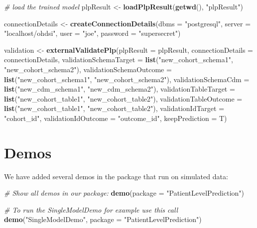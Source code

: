 \documentclass[]{article}
\newenvironment{Shaded}{\begin{snugshade}}{\end{snugshade}}
\newcommand{\KeywordTok}[1]{\textcolor[rgb]{0.13,0.29,0.53}{\textbf{#1}}}
\newcommand{\DataTypeTok}[1]{\textcolor[rgb]{0.13,0.29,0.53}{#1}}
\newcommand{\StringTok}[1]{\textcolor[rgb]{0.31,0.60,0.02}{#1}}
\newcommand{\CommentTok}[1]{\textcolor[rgb]{0.56,0.35,0.01}{\textit{#1}}}
\newcommand{\NormalTok}[1]{#1}
\begin{document}
\begin{Shaded}
\begin{Highlighting}[]
\CommentTok{# load the trained model}
\NormalTok{plpResult <-}\StringTok{ }\KeywordTok{loadPlpResult}\NormalTok{(}\KeywordTok{getwd}\NormalTok{(), }\StringTok{"plpResult"}\NormalTok{)}

\NormalTok{connectionDetails <-}\StringTok{ }\KeywordTok{createConnectionDetails}\NormalTok{(}\DataTypeTok{dbms =} \StringTok{"postgresql"}\NormalTok{, }\DataTypeTok{server =} \StringTok{"localhost/ohdsi"}\NormalTok{, }
    \DataTypeTok{user =} \StringTok{"joe"}\NormalTok{, }\DataTypeTok{password =} \StringTok{"supersecret"}\NormalTok{)}

\NormalTok{validation <-}\StringTok{ }\KeywordTok{externalValidatePlp}\NormalTok{(}\DataTypeTok{plpResult =}\NormalTok{ plpResult, }\DataTypeTok{connectionDetails =}\NormalTok{ connectionDetails, }
    \DataTypeTok{validationSchemaTarget =} \KeywordTok{list}\NormalTok{(}\StringTok{"new_cohort_schema1"}\NormalTok{, }\StringTok{"new_cohort_schema2"}\NormalTok{), }
    \DataTypeTok{validationSchemaOutcome =} \KeywordTok{list}\NormalTok{(}\StringTok{"new_cohort_schema1"}\NormalTok{, }\StringTok{"new_cohort_schema2"}\NormalTok{), }
    \DataTypeTok{validationSchemaCdm =} \KeywordTok{list}\NormalTok{(}\StringTok{"new_cdm_schema1"}\NormalTok{, }\StringTok{"new_cdm_schema2"}\NormalTok{), }\DataTypeTok{validationTableTarget =} \KeywordTok{list}\NormalTok{(}\StringTok{"new_cohort_table1"}\NormalTok{, }
        \StringTok{"new_cohort_table2"}\NormalTok{), }\DataTypeTok{validationTableOutcome =} \KeywordTok{list}\NormalTok{(}\StringTok{"new_cohort_table1"}\NormalTok{, }
        \StringTok{"new_cohort_table2"}\NormalTok{), }\DataTypeTok{validationIdTarget =} \StringTok{"cohort_id"}\NormalTok{, }\DataTypeTok{validationIdOutcome =} \StringTok{"outcome_id"}\NormalTok{, }
    \DataTypeTok{keepPrediction =}\NormalTok{ T)}
\end{Highlighting}
\end{Shaded}

\section{Demos}\label{demos}

We have added several demos in the package that run on simulated data:

\begin{Shaded}
\begin{Highlighting}[]
\CommentTok{# Show all demos in our package: }
 \KeywordTok{demo}\NormalTok{(}\DataTypeTok{package =} \StringTok{"PatientLevelPrediction"}\NormalTok{)}

\CommentTok{# To run the SingleModelDemo for example use this call}
 \KeywordTok{demo}\NormalTok{(}\StringTok{"SingleModelDemo"}\NormalTok{, }\DataTypeTok{package =} \StringTok{"PatientLevelPrediction"}\NormalTok{)}
\end{Highlighting}
\end{Shaded}
\end{document}
